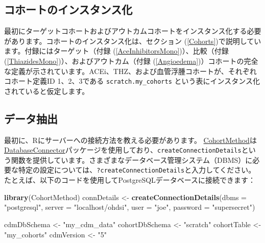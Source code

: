 \documentclass[
  11pt]{book}
\newenvironment{Shaded}{\begin{snugshade}}{\end{snugshade}}
\newcommand{\AttributeTok}[1]{\textcolor[rgb]{0.13,0.29,0.53}{#1}}
\newcommand{\FunctionTok}[1]{\textcolor[rgb]{0.13,0.29,0.53}{\textbf{#1}}}
\newcommand{\NormalTok}[1]{#1}
\newcommand{\OtherTok}[1]{\textcolor[rgb]{0.56,0.35,0.01}{#1}}
\newcommand{\StringTok}[1]{\textcolor[rgb]{0.31,0.60,0.02}{#1}}
\theoremstyle{definition}
\theoremstyle{definition}
\theoremstyle{definition}
\theoremstyle{definition}
\theoremstyle{remark}
\begin{document}
\subsection{コホートのインスタンス化}\label{ux30b3ux30dbux30fcux30c8ux306eux30a4ux30f3ux30b9ux30bfux30f3ux30b9ux5316}

最初にターゲットコホートおよびアウトカムコホートをインスタンス化する必要があります。コホートのインスタンス化は、セクション (\ref{Cohorts})で説明しています。付録にはターゲット（付録 (\ref{AceInhibitorsMono})）、比較（付録 (\ref{ThiazidesMono})）、およびアウトカム（付録 (\ref{Angioedema})）コホートの完全な定義が示されています。ACEi、THZ、および血管浮腫コホートが、それぞれコホート定義ID 1、2、3である \texttt{scratch.my\_cohorts} という表にインスタンス化されていると仮定します。

\subsection{データ抽出}\label{ux30c7ux30fcux30bfux62bdux51fa-1}

最初に、Rにサーバーへの接続方法を教える必要があります。 \href{https://ohdsi.github.io/CohortMethod/}{CohortMethod}は\href{https://ohdsi.github.io/DatabaseConnector/}{DatabaseConnector}パッケージを使用しており、\texttt{createConnectionDetails}という関数を提供しています。さまざまなデータベース管理システム（DBMS）に必要な特定の設定については、\texttt{?createConnectionDetails}と入力してください。たとえば、以下のコードを使用してPostgreSQLデータベースに接続できます：

\begin{Shaded}
\begin{Highlighting}[]
\FunctionTok{library}\NormalTok{(CohortMethod)}
\NormalTok{connDetails }\OtherTok{\textless{}{-}} \FunctionTok{createConnectionDetails}\NormalTok{(}\AttributeTok{dbms =} \StringTok{"postgresql"}\NormalTok{,}
                                       \AttributeTok{server =} \StringTok{"localhost/ohdsi"}\NormalTok{,}
                                       \AttributeTok{user =} \StringTok{"joe"}\NormalTok{,}
                                       \AttributeTok{password =} \StringTok{"supersecret"}\NormalTok{)}

\NormalTok{cdmDbSchema }\OtherTok{\textless{}{-}} \StringTok{"my\_cdm\_data"}
\NormalTok{cohortDbSchema }\OtherTok{\textless{}{-}} \StringTok{"scratch"}
\NormalTok{cohortTable }\OtherTok{\textless{}{-}} \StringTok{"my\_cohorts"}
\NormalTok{cdmVersion }\OtherTok{\textless{}{-}} \StringTok{"5"}
\end{Highlighting}
\end{Shaded}
\end{document}
